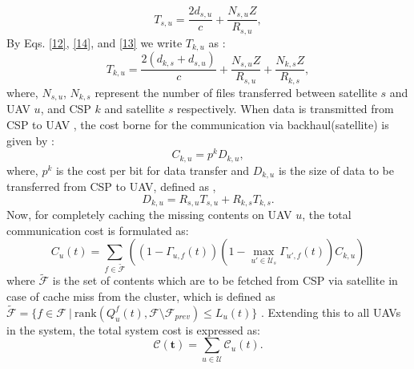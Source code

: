 \documentclass[journal]{IEEEtran}
\begin{document}
\begin{equation} \label{13}
        T_{s,u} = \frac{2d_{s,u}}{c}  + \frac{N_{s,u}Z}{R_{s,u}},
\end{equation}
By Eqs. \eqref{12}, \eqref{14}, and \eqref{13} we write $T_{k,u}$ as \cite{10667821}:
\begin{equation}
        T_{k, u} = \frac{2(d_{k,s}+d_{s,u})}{c} + \frac{N_{s,u}Z}{R_{s,u}} + \frac{N_{k,s}Z}{R_{k,s}},
\end{equation}
where, $N_{s,u}$, $N_{k,s}$ represent the number of files transferred between satellite $s$ and UAV $u$, and CSP $k$ and satellite $s$ respectively. When data is transmitted from CSP to UAV , the cost borne for the communication via backhaul(satellite) is given by \cite{10667821}:
\begin{equation}
    C_{k,u} =p^k D_{k,u},
\end{equation}
where, $p^k$ is the cost per bit for data transfer and $D_{k,u}$ is the size of data to be transferred from CSP to UAV, defined as \cite{10667821},
\begin{equation}
    D_{k,u} = R_{s,u}  T_{s,u} + R_{k,s}  T_{k,s}.
\end{equation}
Now, for completely caching the missing contents  on UAV $u$, the total communication cost is formulated as:
\begin{equation}
    C_u(t) =  \sum_{f \in \mathcal{\tilde{F}}} \left( (1 -  \Gamma_{u,f}(t))(1 - \max_{u' \in \mathcal{U}_s} \Gamma_{u',f}(t)) C_{k,u} \right)
\end{equation}
where  $\mathcal{\tilde{F}}$ is the set of contents which are to be fetched from CSP via satellite in case of cache miss from the cluster, which is defined as  $\mathcal{\tilde{F}} = \{ f \in \mathcal{F} \ | \ \text{rank} \left({Q}^{f}_{u}(t), \mathcal{F} \setminus \mathcal{F}_{{prev}} \right) \leq L_u(t) \}$
. Extending this to all UAVs in the system, the total system cost is expressed as:
\begin{equation}
    \boldsymbol{\mathcal{C}(t)} = \sum\limits_{u \in \mathcal{U}} \mathcal{C}_u(t).
    \label{costall}
\end{equation}
\end{document}
